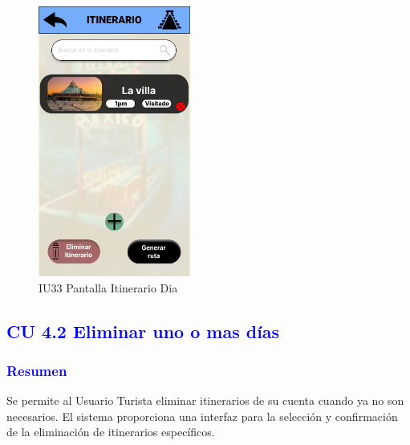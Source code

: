 \begin{figure}[htbp]
        \centering
        \includegraphics[width= 5cm]{Pantallas Prototipo3/IU33 Pantalla Itinerario Dia.jpg}
        \caption{IU33 Pantalla Itinerario Dia}
        \label{fig:enter-label}
        \vspace{200pt}
\end{figure}






\newpage
\subsection{\textcolor{blue}{CU 4.2 Eliminar uno o mas días}}
\subsubsection{\textcolor{blue}{Resumen}}
Se permite al Usuario Turista eliminar itinerarios de su cuenta cuando ya no son necesarios. El sistema proporciona una interfaz para la selección y confirmación de la eliminación de itinerarios
específicos.

